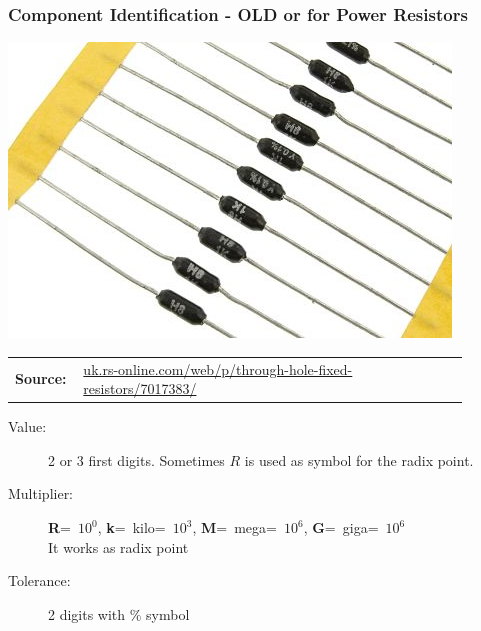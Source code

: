 \documentclass{beamer}
\begin{document}
	\begin{frame}
    \frametitle{Component Identification - OLD or for Power Resistors}
		\begin{center}
		\includegraphics[scale=0.4]{obr04_vykonoveZn.png}\\
		\begin{tabular}{p{0.1\linewidth} p{0.8\linewidth}}
			\tiny{\textbf{Source:}} 	& \tiny{\url{uk.rs-online.com/web/p/through-hole-fixed-resistors/7017383/}}\\
		\end{tabular}
		\begin{description}
		\item[Value:] 2 or 3 first digits. Sometimes $R$ is used as symbol for the radix point.
		\item[Multiplier:] \textbf{R}=~$10^0$, \textbf{k}=~kilo=~$10^3$, \textbf{M}=~mega=~$10^6$, \textbf{G}=~giga=~$10^6$\\
											It works as radix point
		\item[Tolerance:]	2 digits with $\%$ symbol
		\end{description}
		\end{center}
  \end{frame}
\end{document}
